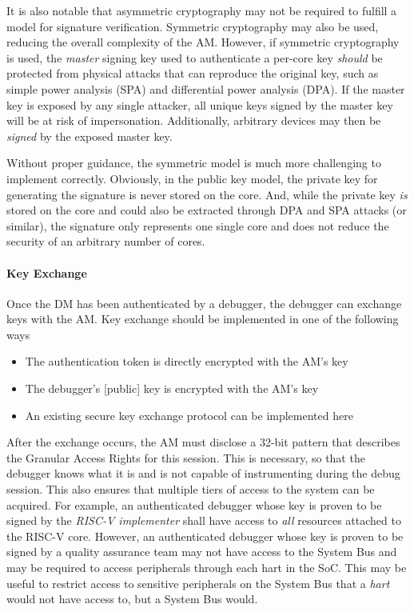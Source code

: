It is also notable that asymmetric cryptography may not be required to fulfill a model for signature verification. Symmetric cryptography may also be used, reducing the overall complexity of the AM. However, if symmetric cryptography is used, the {\em master} signing key used to authenticate a per-core key {\em should} be protected from physical attacks that can reproduce the original key, such as simple power analysis (SPA) and differential power analysis (DPA). If the master key is exposed by any single attacker, all unique keys signed by the master key will be at risk of impersonation. Additionally, arbitrary devices may then be {\em signed} by the exposed master key. 

Without proper guidance, the symmetric model is much more challenging to implement correctly. Obviously, in the public key model, the private key for generating the signature is never stored on the core. And, while the private key {\em is} stored on the core and could also be extracted through DPA and SPA attacks (or similar), the signature only represents one single core and does not reduce the security of an arbitrary number of cores.

\paragraph{Key Exchange}
Once the DM has been authenticated by a debugger, the debugger can exchange keys with the AM. Key exchange should be implemented in one of the following ways
\begin{itemize}
    \item The authentication token is directly encrypted with the AM's key
    \item The debugger's [public] key is encrypted with the AM's key
    \item An existing secure key exchange protocol can be implemented here
\end{itemize}

After the exchange occurs, the AM must disclose a 32-bit pattern that describes the Granular Access Rights for this session. This is necessary, so that the debugger knows what it is and is not capable of instrumenting during the debug session. This also ensures that multiple tiers of access to the system can be acquired. For example, an authenticated debugger whose key is proven to be signed by the {\em RISC-V implementer} shall have access to {\em all} resources attached to the RISC-V core. However, an authenticated debugger whose key is proven to be signed by a quality assurance team may not have access to the System Bus and may be required to access peripherals through each hart in the SoC. This may be useful to restrict access to sensitive peripherals on the System Bus that a {\em hart} would not have access to, but a System Bus would. 

